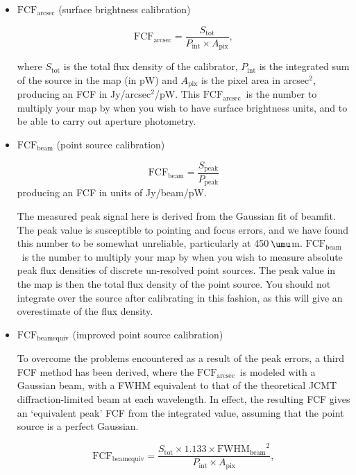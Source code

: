 \documentclass[twoside,11pt]{article}
\newcommand{\micron}{\mbox{\,${\umu}$m}}            %
\newcommand{\xref}[3]{#1}
\renewcommand{\_}{\texttt{\symbol{95}}}
\newcommand{\fcfbe}{$\mathrm{FCF_{beamequiv}}$}
\newcommand{\fcfb}{$\mathrm{FCF_{beam}}$}
\newcommand{\fcfa}{$\mathrm{FCF_{arcsec}}$}
\newcommand{\task}[1]{\textsf{#1}}
\newcommand{\beamfit}{\xref{\task{beamfit}}{sun95}{BEAMFIT}}
\begin{document}
\begin{itemize}

\item{\textbf{\fcfa} (surface brightness calibration)}

\begin{equation}
\label{eq:fcf_arcsec}
\mathrm{FCF_{arcsec}} = \frac{S_\mathrm{tot}}{P_\mathrm{int} \times
  A_\mathrm{pix}},
\end{equation}

where $S_\mathrm{tot}$ is the total flux density of the calibrator,
$P_\mathrm{int}$ is the integrated sum of the source in the map (in
pW) and $A_\mathrm{pix}$ is the pixel area in arcsec$^2$, producing an
FCF in Jy/arcsec$^2$/pW. This \fcfa\ is the number to
multiply your map by when you wish to have surface brightness units,
and to be able to carry out aperture photometry.

\item{\textbf{\fcfb} (point source calibration)}

\begin{equation}
\label{eq:fcf_beam}
\mathrm{FCF_{beam}} = \frac{S_\mathrm{{peak}}}{P_\mathrm{peak}}
\end{equation}
producing an FCF in units of Jy/beam/pW.

The measured peak signal here is derived from the Gaussian fit of
\beamfit. The peak value is susceptible to pointing and focus errors,
and we have found this number to be somewhat unreliable, particularly
at 450\micron. \fcfb\ is the number to multiply your
map by when you wish to measure absolute peak flux densities of
discrete un-resolved point sources. The peak value in the map is then
the total flux density of the point source. You should not integrate
over the source after calibrating in this fashion, as this will give
an overestimate of the flux density.

\item{\textbf{\fcfbe} (improved point source calibration)}

To overcome the problems encountered as a result of the peak errors, a
third FCF method has been derived, where the \fcfa\
is modeled with a Gaussian beam, with a FWHM equivalent to that of the
theoretical JCMT diffraction-limited beam at each wavelength. In
effect, the resulting FCF gives an `equivalent peak' FCF from the
integrated value, assuming that the point source is a perfect
Gaussian.

\begin{equation}
\label{eq:fcf_beamequiv}
\mathrm{FCF_{beamequiv}} = \frac{S_\mathrm{tot} \times 1.133 \times
  {\mathrm{FWHM_{beam}}}^2}{P_\mathrm{int} \times A_\mathrm{pix}},
\end{equation}


\end{itemize}
\end{document}

